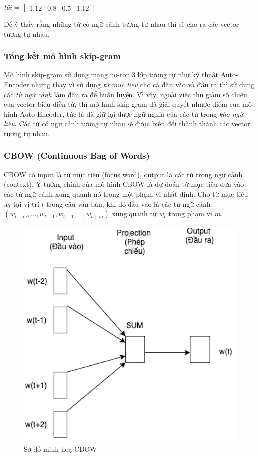 \textit{tôi} = $\begin{bmatrix}
        1.12 & 0.8 & 0.5 & 1.12
    \end{bmatrix}$

Để ý thấy rằng những từ có ngữ cảnh tương tự nhau thì sẽ cho ra các vector tương tự nhau.

\subsubsection{Tổng kết mô hình skip-gram}
Mô hình skip-gram sử dụng mạng nơ-ron 3 lớp tương tự như kỹ thuật Auto-Encoder nhưng thay vì sử dụng \textit{từ mục tiêu} cho cả đầu vào và đầu ra thì sử dụng các \textit{từ ngữ cảnh} làm đầu ra để huấn luyện. Vì vậy, ngoài việc thu giảm số chiều của vector biểu diễn từ, thì mô hình skip-gram đã giải quyết nhược điểm của mô hình Auto-Encoder, tức là đã giữ lại được ngữ nghĩa của các từ trong \textit{kho ngữ liệu}. Các từ có ngữ cảnh tương tự nhau sẽ được biến đổi thành thành các vector tương tự nhau.

\subsubsection{CBOW (Continuous Bag of Words)}
CBOW có input là từ mục tiêu (focus word), output là các từ trong ngữ cảnh  (context). Ý tưởng chính của mô hình CBOW là dự đoán từ mục tiêu dựa vào các từ ngữ cảnh xung quanh nó trong một phạm vi nhất định. Cho từ mục tiêu $w_{t}$ tại vị trí $t$ trong câu văn bản, khi đó đầu vào là các từ ngữ cảnh $(w_{t-m}, ..., w_{t-1}, w_{t+1}, ..., w_{t+m})$ xung quanh từ $w_{t}$ trong phạm vi $m$.
\clearpage
\begin{figure}[ht]
	\centering
		\includegraphics[width=0.5\columnwidth]{books/artificial-neural-network/chapter04/figure/cbow_1.png}
        \caption{Sơ đồ minh hoạ CBOW }
        \label{fig:cbow1}
\end{figure}

